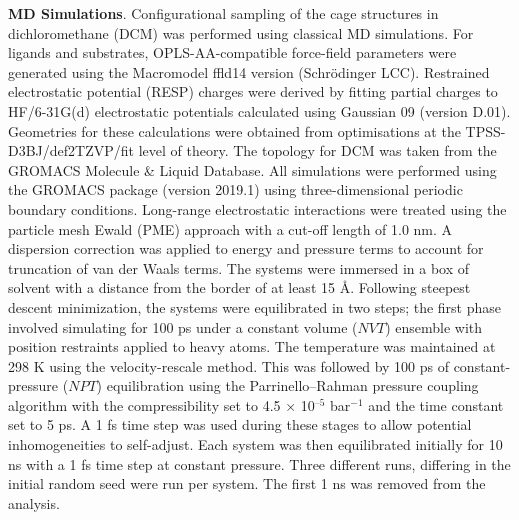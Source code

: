 \documentclass[../../main.tex]{subfiles}
\begin{document}
{\bfseries{MD Simulations}}. Configurational sampling of the cage structures in dichloromethane (DCM) was performed using classical MD simulations. For ligands and substrates, OPLS-AA-compatible force-field parameters were generated using the Macromodel ffld14 version (Schrödinger LCC).\cite{MacroModel} Restrained electrostatic potential (RESP) charges were derived by fitting partial charges to HF/6-31G(d) electrostatic potentials calculated using Gaussian 09 (version D.01).\cite{G09} Geometries for these calculations were obtained from optimisations at the TPSS-D3BJ/def2TZVP/fit level of theory. The topology for DCM was taken from the GROMACS Molecule \& Liquid Database.\cite{vanderSpoel2012}
All simulations were performed using the GROMACS package (version 2019.1)\cite{Abraham2015} using three-dimensional periodic boundary conditions. Long-range electrostatic interactions were treated using the particle mesh Ewald (PME) approach\cite{Darden1993} with a cut-off length of 1.0 nm. A dispersion correction was applied to energy and pressure terms to account for truncation of van der Waals terms.
The systems were immersed in a box of solvent with a distance from the border of at least 15 \AA. Following steepest descent minimization, the systems were equilibrated in two steps; the first phase involved simulating for 100 ps under a constant volume ($NVT$) ensemble with position restraints applied to heavy atoms. The temperature was maintained at 298 K using the velocity-rescale method. This was followed by 100 ps of constant-pressure ($NPT$) equilibration using the Parrinello–Rahman pressure coupling algorithm with the compressibility set to 4.5 × 10${}^{–5}$ bar${}^{-1}$ and the time constant set to 5 ps. A 1 fs time step was used during these stages to allow potential inhomogeneities to self-adjust. Each system was then equilibrated initially for 10 ns with a 1 fs time step at constant pressure. Three different runs, differing in the initial random seed were run per system. The first 1 ns was removed from the analysis.
\end{document}
